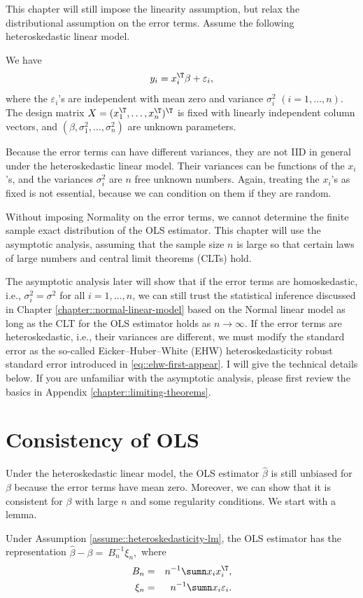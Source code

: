 This chapter will still impose the linearity assumption, but
relax the distributional assumption on the error terms. Assume the following heteroskedastic linear model.


\begin{assumption}
\label{assume::heteroskedasticity-lm}
We have
\[
y_{i}=x_{i}^{\T}\beta+\varepsilon_{i},
\]
where the $\varepsilon_{i}$'s are independent
with mean zero and variance $\sigma_{i}^{2}$ $(i=1,\ldots,n)$.
The design matrix $X = (x_1^{\T}, \ldots, x_n^{\T})^{\T}$ is fixed with linearly independent column vectors, and $(\beta,\sigma^{2}_1, \ldots, \sigma^2_n)$
are unknown parameters. 
\end{assumption}


 Because
the error terms can have different variances, they are not IID
in general under the heteroskedastic linear model. Their variances can be functions of the $x_{i}$'s, and
the variances $\sigma_{i}^{2}$ are $n$ free unknown numbers. Again, treating the
$x_{i}$'s as fixed is not essential, because we can condition on
them if they are random. 


Without imposing Normality on the error terms,
we cannot determine the finite sample exact distribution of the OLS
estimator. This chapter will use the asymptotic analysis,
assuming that the sample size $n$ is large so that certain laws of large numbers and central limit theorems (CLTs) hold. 

The asymptotic analysis later will show that if the error terms are
homoskedastic, i.e., $\sigma_{i}^{2}=\sigma^{2}$ for all $i=1,\ldots,n$,
we can still trust the statistical inference discussed in Chapter \ref{chapter::normal-linear-model} based on the Normal
linear model as long as the CLT for the OLS estimator
holds as $n\rightarrow\infty$. If the error terms are heteroskedastic,
i.e., their variances are different, we must modify the standard
error as the so-called Eicker--Huber--White (EHW) heteroskedasticity robust standard error introduced in \eqref{eq::ehw-first-appear}. 
I will give the technical details below. 
If you are unfamiliar with the asymptotic analysis, please first review the basics in Appendix \ref{chapter::limiting-theorems}. 


\section{Consistency of OLS}


Under the heteroskedastic linear model,  the OLS estimator $\hat{\beta}$ is still unbiased for $\beta$ because the error terms have mean zero. Moreover, we can show that it is consistent
for $\beta$ with large $n$ and some regularity conditions. We start
with a lemma.
\begin{lemma}
\label{lem:The-OLS-estimator}
Under Assumption \ref{assume::heteroskedasticity-lm}, the OLS estimator has the
representation
$
\hat{\beta}-\beta=\ B_{n}^{-1} \xi_n,
$
where
\begin{eqnarray*}
B_{n} &=& n^{-1}\sumn x_{i}x_{i}^{\T},\\ 
\xi_n &=& n^{-1}\sumn x_{i}\varepsilon_{i} . 
\end{eqnarray*}
\end{lemma}


